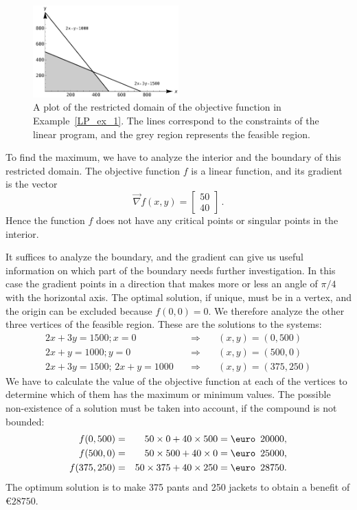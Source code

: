 \begin{example}
\begin{figure}[H]
\centering
\includegraphics[width=0.5\textwidth]{fig_multi_var_29}
\caption{A plot of the restricted domain of the objective function in Example~\ref{LP_ex_1}. The lines correspond to the constraints of the linear program, and the grey region represents the feasible region.}
\label{fig_multi_var_29}
\end{figure}

To find the maximum, we have to analyze the interior and the boundary of this restricted domain. The objective function $f$ is a linear function, and its gradient is the vector $$\vec{\nabla} f(x,y) = \begin{bmatrix}50 \\ 40\end{bmatrix} \,.$$ Hence the function $f$ does not have any critical points or singular points in the interior. 

It suffices to analyze the boundary, and the gradient can give us useful information on which part of the boundary needs further investigation. In this case the gradient points in a direction that makes more or less an angle of $\pi/4$ with the horizontal axis. The optimal solution, if unique, must be in a vertex, and the origin can be excluded because $f(0,0) =0$.  We therefore analyze the other three vertices of the feasible region. These are the solutions to the systems:
\begin{eqnarray*}
2x + 3y = 1500; x = 0          & \quad \Rightarrow \quad &(x,y)= (0, 500) \\
2x + y = 1000; y = 0           & \quad \Rightarrow \quad &(x,y)= (500, 0)\\
2x + 3y =1500;\,  2x + y = 1000   &\quad \Rightarrow \quad &(x,y)= (375, 250)
\end{eqnarray*}
We have to calculate the value of the objective function at each of the vertices to determine which of them has the maximum or minimum values. The possible non-existence of a solution must be taken into account, if the compound is not bounded:
\begin{eqnarray*}
f(0, 500) &=& 50\times0 + 40\times500 = \text{\euro }\,20000, \\
f(500, 0) &=& 50\times500 + 40\times0 = \text{\euro }\,25000, \\
f(375, 250) &=& 50\times375 + 40\times250 = \text{\euro }\,28750. 
\end{eqnarray*}
The optimum solution is to make 375 pants and 250 jackets to obtain a benefit of \euro $28750$.
\end{example}

